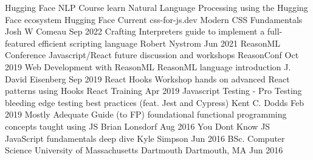 \documentclass[]{awesome-cv}
\begin{document}
\begin{cvhonors}
	\cvhonor
	{Hugging Face NLP Course}
	{learn Natural Language Processing using the Hugging Face ecosystem}
	{Hugging Face}
	{Current}
	\cvhonor
	{css-for-js.dev}
	{Modern CSS Fundamentals}
	{Josh W Comeau}
	{Sep 2022}
	\cvhonor
	{Crafting Interpreters}
	{guide to implement a full-featured efficient scripting language}
	{Robert Nystrom}
	{Jun 2021}
	\cvhonor
	{ReasonML Conference}
	{Javascript/React future discussion and workshops}
	{ReasonConf}
	{Oct 2019}
	\cvhonor
	{Web Development with ReasonML}
	{ReasonML language introduction}
	{J. David Eisenberg}
	{Sep 2019}
	\cvhonor
	{React Hooks Workshop}
	{hands on advanced React patterns using Hooks}
	{React Training}
	{Apr 2019}
	\cvhonor
	{Javascript Testing - Pro Testing}
	{bleeding edge testing best practices (feat. Jest and Cypress)}
	{Kent C. Dodds}
	{Feb 2019}
	\cvhonor
	{Mostly Adequate Guide (to FP)}
	{foundational functional programming concepts taught using JS}
	{Brian Lonsdorf}
	{Aug 2016}
	\cvhonor
	{You Don\textquotesingle{}t Know JS}
	{JavaScript fundamentals deep dive}
	{Kyle Simpson}
	{Jun 2016}
	\cvhonor
	{BSc. Computer Science}
	{University of Massachusetts Dartmouth}
	{Dartmouth, MA}
	{Jun 2016}
\end{cvhonors}
\end{document}
